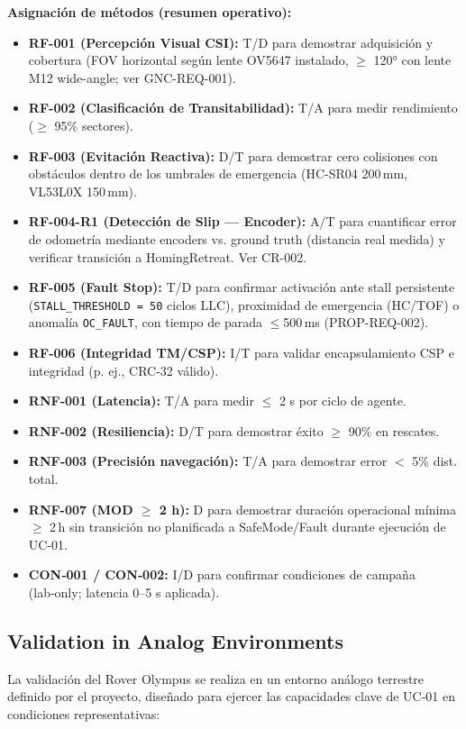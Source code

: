 \textbf{Asignación de métodos (resumen operativo):}
\begin{itemize}
    \item \textbf{RF-001 (Percepción Visual CSI):} T/D para demostrar adquisición y cobertura (FOV horizontal según lente OV5647 instalado, $\ge$ 120° con lente M12 wide-angle; ver GNC-REQ-001).
    \item \textbf{RF-002 (Clasificación de Transitabilidad):} T/A para medir rendimiento ($\ge$ 95\% sectores).
    \item \textbf{RF-003 (Evitación Reactiva):} D/T para demostrar cero colisiones con obstáculos dentro de los umbrales de emergencia (HC-SR04 200\,mm, VL53L0X 150\,mm).
    \item \textbf{RF-004-R1 (Detección de Slip --- Encoder):} A/T para cuantificar error de odometría mediante encoders vs. ground truth (distancia real medida) y verificar transición a HomingRetreat. Ver CR-002.
    \item \textbf{RF-005 (Fault Stop):} T/D para confirmar activación ante stall persistente (\texttt{STALL\_THRESHOLD = 50} ciclos LLC), proximidad de emergencia (HC/TOF) o anomalía \texttt{OC\_FAULT}, con tiempo de parada $\le$500\,ms (PROP-REQ-002).
    \item \textbf{RF‑006 (Integridad TM/CSP):} I/T para validar encapsulamiento CSP e integridad (p. ej., CRC‑32 válido).  
    \item \textbf{RNF‑001 (Latencia):} T/A para medir $\le$ 2 s por ciclo de agente.  
    \item \textbf{RNF‑002 (Resiliencia):} D/T para demostrar éxito $\ge$ 90\% en rescates.  
    \item \textbf{RNF‑003 (Precisión navegación):} T/A para demostrar error $<$ 5\% dist. total.  
    \item \textbf{RNF-007 (MOD $\ge$ 2 h):} D para demostrar duración operacional mínima $\ge$ 2\,h sin transición no planificada a SafeMode/Fault durante ejecución de UC-01.
    \item \textbf{CON‑001 / CON‑002:} I/D para confirmar condiciones de campaña (lab‑only; latencia 0–5 s aplicada).
\end{itemize}

\subsection{Validation in Analog Environments}

La validación del Rover Olympus se realiza en un entorno análogo terrestre definido por el proyecto, diseñado para ejercer las capacidades clave de UC‑01 en condiciones representativas:

